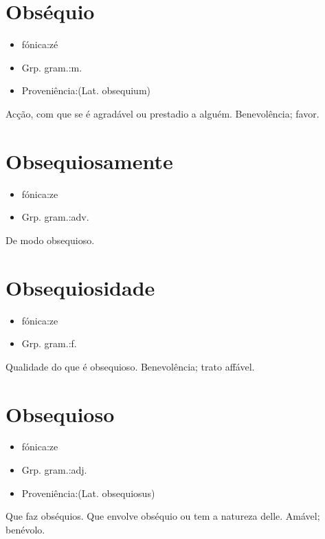 \section{Obséquio}
\begin{itemize}
\item {fónica:zé}
\end{itemize}
\begin{itemize}
\item {Grp. gram.:m.}
\end{itemize}
\begin{itemize}
\item {Proveniência:(Lat. \textunderscore obsequium\textunderscore )}
\end{itemize}
Acção, com que se é agradável ou prestadio a alguém.
Benevolência; favor.
\section{Obsequiosamente}
\begin{itemize}
\item {fónica:ze}
\end{itemize}
\begin{itemize}
\item {Grp. gram.:adv.}
\end{itemize}
De modo obsequioso.
\section{Obsequiosidade}
\begin{itemize}
\item {fónica:ze}
\end{itemize}
\begin{itemize}
\item {Grp. gram.:f.}
\end{itemize}
Qualidade do que é obsequioso.
Benevolência; trato affável.
\section{Obsequioso}
\begin{itemize}
\item {fónica:ze}
\end{itemize}
\begin{itemize}
\item {Grp. gram.:adj.}
\end{itemize}
\begin{itemize}
\item {Proveniência:(Lat. \textunderscore obsequiosus\textunderscore )}
\end{itemize}
Que faz obséquios.
Que envolve obséquio ou tem a natureza delle.
Amável; benévolo.
